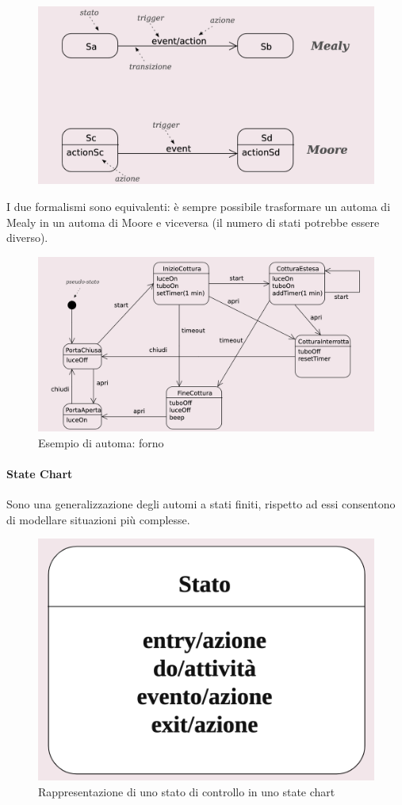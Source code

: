 \begin{figure}[H]
    \centering
    \includegraphics[width=0.75\linewidth]{assets/UML/state/state1.png}
\end{figure}

I due formalismi sono equivalenti: è sempre possibile trasformare un automa di Mealy in un automa di Moore e viceversa (il numero di stati potrebbe essere diverso).

\begin{figure}[H]
    \centering
    \includegraphics[width=0.75\linewidth]{assets/UML/state/state2.png}
    \caption{Esempio di automa: forno}
\end{figure}

\paragraph{State Chart} Sono una generalizzazione degli automi a stati finiti, rispetto ad essi consentono di modellare situazioni più complesse.

\begin{figure}[H]
    \centering
    \includegraphics[width=0.25\linewidth]{assets/UML/state/state3.png}
    \caption{Rappresentazione di uno stato di controllo in uno state chart}
\end{figure}

